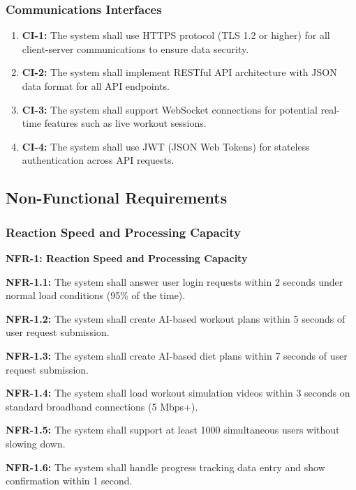 \documentclass[12pt,a4paper]{article}
\begin{document}
\subsubsection{Communications Interfaces}
\begin{enumerate}
    \item \textbf{CI-1:} The system shall use HTTPS protocol (TLS 1.2 or higher) for all client-server communications to ensure data security.
    
    \item \textbf{CI-2:} The system shall implement RESTful API architecture with JSON data format for all API endpoints.
    
    \item \textbf{CI-3:} The system shall support WebSocket connections for potential real-time features such as live workout sessions.
    
    \item \textbf{CI-4:} The system shall use JWT (JSON Web Tokens) for stateless authentication across API requests.
\end{enumerate}

\subsection{Non-Functional Requirements}

\subsubsection{Reaction Speed and Processing Capacity}

\textbf{NFR-1: Reaction Speed and Processing Capacity}

\textbf{NFR-1.1:} The system shall answer user login requests within 2 seconds under normal load conditions (95\% of the time).

\textbf{NFR-1.2:} The system shall create AI-based workout plans within 5 seconds of user request submission.

\textbf{NFR-1.3:} The system shall create AI-based diet plans within 7 seconds of user request submission.

\textbf{NFR-1.4:} The system shall load workout simulation videos within 3 seconds on standard broadband connections (5 Mbps+).

\textbf{NFR-1.5:} The system shall support at least 1000 simultaneous users without slowing down.

\textbf{NFR-1.6:} The system shall handle progress tracking data entry and show confirmation within 1 second.
\end{document}

